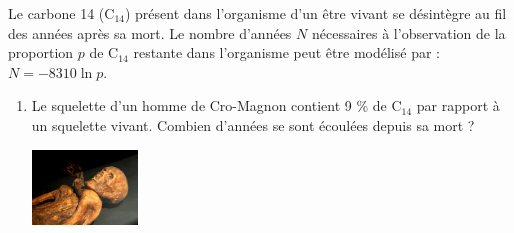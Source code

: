 \documentclass[a4paper,11pt,exos]{nsi} %
\begin{document}
\exo{}
Le carbone 14 (C$_{14}$) présent dans l'organisme d'un être vivant se désintègre au fil des années après sa mort. Le nombre d'années $N$ nécessaires à l'observation de la proportion $p$ de C$_{14}$ restante dans l'organisme peut être modélisé par : $N=-8310 \ln p$.
\begin{enumerate}
    \item Le squelette d'un homme de Cro-Magnon contient 9 \% de C$_{14}$ par rapport à un squelette vivant. Combien d'années se sont écoulées depuis sa mort ?

    {\includegraphics[width=2.8cm]{Otzi-Quinson.jpg}}
\end{enumerate}
\end{document}
